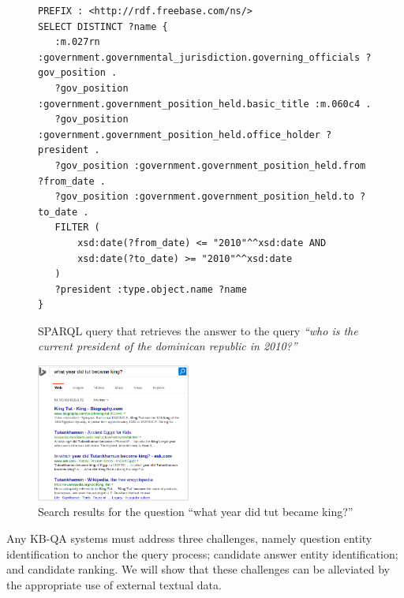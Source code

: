 \begin{figure}
\centering
\begin{lstlisting}[frame=single]
PREFIX : <http://rdf.freebase.com/ns/>
SELECT DISTINCT ?name {
   :m.027rn :government.governmental_jurisdiction.governing_officials ?gov_position .
   ?gov_position :government.government_position_held.basic_title :m.060c4 .
   ?gov_position :government.government_position_held.office_holder ?president .
   ?gov_position :government.government_position_held.from ?from_date .
   ?gov_position :government.government_position_held.to ?to_date .
   FILTER (
       xsd:date(?from_date) <= "2010"^^xsd:date AND
       xsd:date(?to_date) >= "2010"^^xsd:date
   )
   ?president :type.object.name ?name
}
\end{lstlisting}
\caption{SPARQL query that retrieves the answer to the query \textit{``who is the current president of the dominican republic in 2010?''}}
\label{fig:example_sparql}
\end{figure}

\begin{figure}
\centering
\includegraphics[width=0.45\textwidth]{img/web_search_entitylink}
\caption{Search results for the question ``what year did tut became king?''}
\label{fig:web_search_entitylink}
\end{figure}


Any KB-QA systems must address three challenges, namely question entity identification to anchor the query process; candidate answer entity identification; and candidate ranking. We will show that these challenges can be alleviated by the appropriate use of external textual data. 

